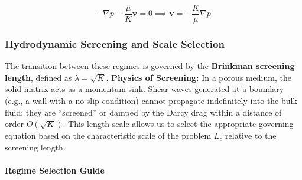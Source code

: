 \begin{equation}
    -\nabla p - \frac{\mu}{K} \mathbf{v} = 0 \implies \mathbf{v} = -\frac{K}{\mu} \nabla p
\end{equation}

\subsubsection{Hydrodynamic Screening and Scale Selection}

The transition between these regimes is governed by the \textbf{Brinkman screening length}, defined as $\lambda = \sqrt{K}$.
\textbf{Physics of Screening:} In a porous medium, the solid matrix acts as a momentum sink.
Shear waves generated at a boundary (e.g., a wall with a no-slip condition) cannot propagate indefinitely into the bulk fluid;
they are ``screened'' or damped by the Darcy drag within a distance of order $O(\sqrt{K})$.
This length scale allows us to select the appropriate governing equation based on the characteristic scale of the problem $L_c$ relative to the screening length.

\paragraph{Regime Selection Guide}

